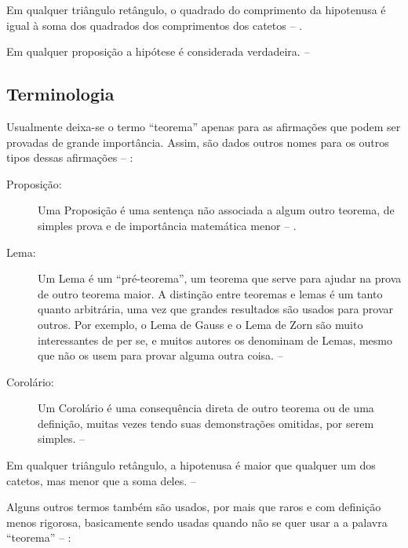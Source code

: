 \begin{teorema}
    Em qualquer triângulo retângulo, o quadrado do comprimento da hipotenusa é
    igual à soma dos quadrados dos comprimentos dos catetos -- \showfont.
\end{teorema}

\begin{proposicao}
Em qualquer proposição a hipótese é considerada verdadeira. -- \showfont
\end{proposicao}

\subsection{Terminologia}

Usualmente deixa-se o termo ``teorema'' apenas para as afirmações que podem ser
provadas de grande importância. Assim, são dados outros nomes para os outros
tipos dessas afirmações -- \showfont:

\begin{description}
    \item[Proposição:] Uma Proposição é uma sentença não associada a algum
        outro teorema, de simples prova e de importância matemática menor --
        \showfont.
    \item[Lema:] Um Lema é um ``pré-teorema'', um teorema que serve para ajudar
        na prova de outro teorema maior. A distinção entre teoremas e lemas é
        um tanto quanto arbitrária, uma vez que grandes resultados são usados
        para provar outros. Por exemplo, o Lema de Gauss e o Lema de Zorn são
        muito interessantes de per se, e muitos autores os denominam de Lemas,
        mesmo que não os usem para provar alguma outra coisa. -- \showfont
    \item[Corolário:] Um Corolário é uma consequência direta de outro teorema
        ou de uma definição, muitas vezes tendo suas demonstrações omitidas,
        por serem simples. -- \showfont
\end{description}

\begin{corolario}
    Em qualquer triângulo retângulo, a hipotenusa é maior que qualquer um dos
    catetos, mas menor que a soma deles. -- \showfont
\end{corolario}

Alguns outros termos também são usados, por mais que raros e com definição
menos rigorosa, basicamente sendo usadas quando não se quer usar a a palavra
``teorema'' -- \showfont:

